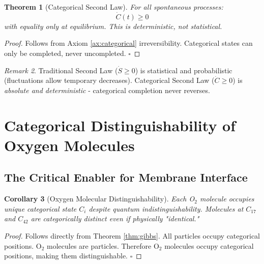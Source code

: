 \documentclass[11pt,a4paper]{article}
\newtheorem{theorem}{Theorem}[section]
\newtheorem{corollary}[theorem]{Corollary}
\theoremstyle{definition}
\theoremstyle{remark}
\newtheorem{remark}[theorem]{Remark}
\begin{document}
\begin{theorem}[Categorical Second Law]
For all spontaneous processes:
\begin{equation}
\dot{C}(t) \geq 0
\end{equation}
with equality only at equilibrium. This is \textit{deterministic}, not statistical.
\end{theorem}

\begin{proof}
Follows from Axiom \ref{ax:categorical} irreversibility. Categorical states can only be completed, never uncompleted. $\square$
\end{proof}

\begin{remark}
Traditional Second Law ($\dot{S} \geq 0$) is statistical and probabilistic (fluctuations allow temporary decreases). Categorical Second Law ($\dot{C} \geq 0$) is \textit{absolute and deterministic} - categorical completion never reverses.
\end{remark}

\section{Categorical Distinguishability of Oxygen Molecules}

\subsection{The Critical Enabler for Membrane Interface}

\begin{corollary}[Oxygen Molecular Distinguishability]
\label{cor:oxygen}
Each O$_2$ molecule occupies unique categorical state $C_i$ despite quantum indistinguishability. Molecules at $C_{17}$ and $C_{42}$ are categorically distinct even if physically "identical."
\end{corollary}

\begin{proof}
Follows directly from Theorem \ref{thm:gibbs}. All particles occupy categorical positions. O$_2$ molecules are particles. Therefore O$_2$ molecules occupy categorical positions, making them distinguishable. $\square$
\end{proof}
\end{document}
